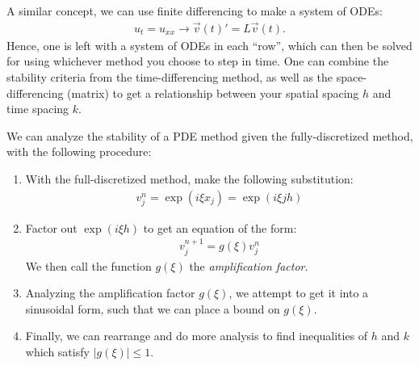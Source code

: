 \documentclass{article}
\begin{document}
 A similar concept, we can use finite differencing to make a system of ODEs:
\begin{align*}
  u_t = u_{xx} \to \vec{v}(t)' = L\vec{v}(t).
\end{align*}
Hence, one is left with a system of ODEs in each ``row'', which can then be solved for using whichever method you choose to step in time.
\gap
{} One can combine the stability criteria from the time-differencing method, as well as the space-differencing (matrix) to get a relationship between your spatial spacing $h$ and time spacing $k$.

 We can analyze the stability of a PDE method given the fully-discretized method, with the following procedure:
\begin{enumerate}
\item With the full-discretized method, make the following substitution:
  \begin{align*}
    v_j^n = \exp(i \xi x_j) = \exp(i \xi jh)
  \end{align*}
\item Factor out $\exp(i \xi h)$ to get an equation of the form:
  \begin{align*}
    v_j^{n + 1} = g(\xi)v_j^n
  \end{align*}
  We then call the function $g(\xi)$ the \textit{amplification factor}.
\item Analyzing the amplification factor $g(\xi)$, we attempt to get it into a sinusoidal
  form, such that we can place a bound on $g(\xi)$.
\item Finally, we can rearrange and do more analysis to find inequalities of $h$ and $k$ which satisfy $|g(\xi)| \leq 1$.
\end{enumerate}

\clearpage

\end{document}
